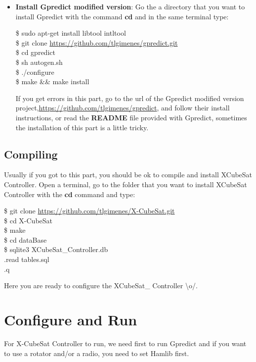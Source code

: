 \documentclass[pdftex,11pt,a4paper,titlepage]{report}
\begin{document}
\begin{itemize}
\item \textbf{Install Gpredict modified version}: Go the a directory that you want to install Gpredict with the command \textbf{cd} and in the same terminal type:
\begin{framed}
\$ sudo apt-get install libtool intltool \\
\$ git clone \url{https://github.com/tlgimenes/gpredict.git} \\
\$ cd gpredict \\
\$ sh autogen.sh \\
\$ ./configure \\
\$ make \&\& make install
\end{framed}
If you get errors in this part, go to the url of the Gpredict modified version project,\url{https://github.com/tlgimenes/gpredict}, and follow their install instructions, or read the \textbf{README} file provided with Gpredict, sometimes the installation of this part is a little tricky. 
\end{itemize}

\section{Compiling}
Usually if you got to this part, you should be ok to compile and install XCubeSat Controller. Open a terminal, go to the folder that you want to install XCubeSat Controller with the \textbf{cd} command and type:

\begin{framed}
\$ git clone \url{https://github.com/tlgimenes/X-CubeSat.git} \\
\$ cd X-CubeSat \\
\$ make \\
\$ cd dataBase \\
\$ sqlite3 XCubeSat\_Controller.db \\
.read tables.sql \\
.q
\end{framed}

Here you are ready to configure the XCubeSat\_ Controller \textbackslash o/.

\chapter{Configure and Run}
For X-CubeSat Controller to run, we need first to run Gpredict and if you want to use a rotator and/or a radio, you need to set Hamlib first.
\end{document}
